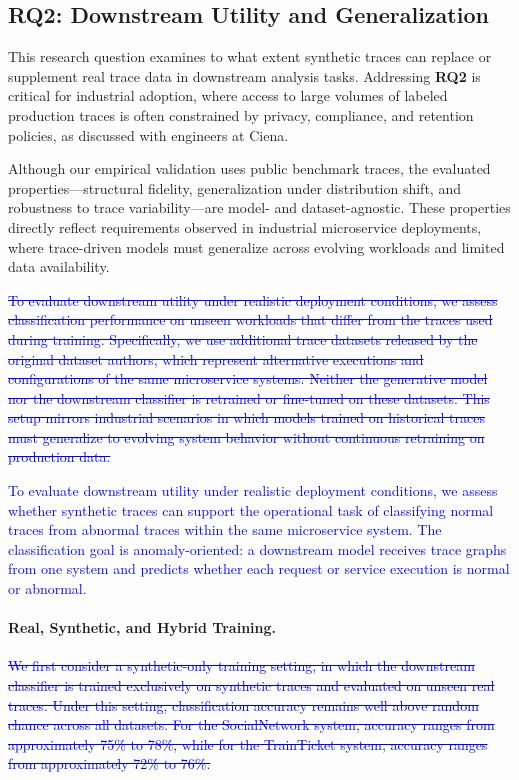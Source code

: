 \documentclass[sigconf,review]{acmart}
\begin{document}
\subsection{RQ2: Downstream Utility and Generalization}
\label{sec:rq2}

This research question examines to what extent synthetic traces can replace or supplement real trace data in downstream analysis tasks. Addressing \textbf{RQ2} is critical for industrial adoption, where access to large volumes of labeled production traces is often constrained by privacy, compliance, and retention policies, as discussed with engineers at Ciena.

Although our empirical validation uses public benchmark traces, the evaluated properties—structural fidelity, generalization under distribution shift, and robustness to trace variability—are model- and dataset-agnostic. These properties directly reflect requirements observed in industrial microservice deployments, where trace-driven models must generalize across evolving workloads and limited data availability.

\textcolor{blue}{\sout{To evaluate downstream utility under realistic deployment conditions, we assess classification performance on unseen workloads that differ from the traces used during training. Specifically, we use additional trace datasets released by the original dataset authors, which represent alternative executions and configurations of the same microservice systems. Neither the generative model nor the downstream classifier is retrained or fine-tuned on these datasets. This setup mirrors industrial scenarios in which models trained on historical traces must generalize to evolving system behavior without continuous retraining on production data.}}

\textcolor{blue}{To evaluate downstream utility under realistic deployment conditions, we assess whether synthetic traces can support the operational task of classifying normal traces from abnormal traces within the same microservice system. The classification goal is anomaly-oriented: a downstream model receives trace graphs from one system and predicts whether each request or service execution is normal or abnormal.}

\paragraph{Real, Synthetic, and Hybrid Training.}
\textcolor{blue}{\sout{We first consider a synthetic-only training setting, in which the downstream classifier is trained exclusively on synthetic traces and evaluated on unseen real traces. Under this setting, classification accuracy remains well above random chance across all datasets. For the SocialNetwork system, accuracy ranges from approximately 75\% to 78\%, while for the TrainTicket system, accuracy ranges from approximately 72\% to 76\%.}}
\end{document}
